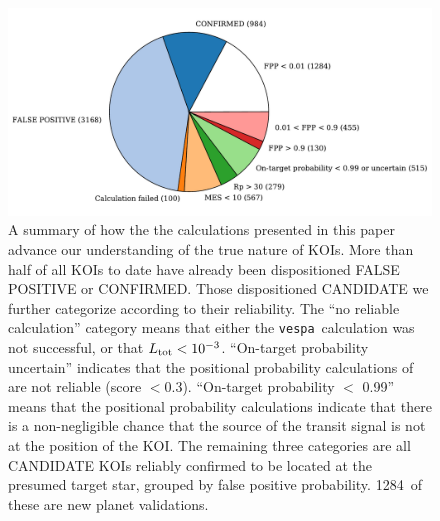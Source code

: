 \documentclass{emulateapj}
\newcommand{\figlabel}[1]{\label{fig:#1}}
\newcommand{\nvalnew}{1284} %
\newcommand{\nfpnew}{428}  %
\newcommand{\posprobthresh}{0.3}
\newcommand{\vespa}{\texttt{vespa}}
\begin{document}
\begin{figure}[p]
\begin{center}
\includegraphics[width=7in]{figures/fpp_pie.pdf}
\end{center}
\caption{A summary of how the the calculations presented in this paper
  advance our understanding of the true nature of KOIs.  More than
  half of all KOIs to date have already been dispositioned FALSE
  POSITIVE or CONFIRMED.  Those dispositioned CANDIDATE we further
  categorize according to their reliability.  The ``no reliable
  calculation'' category means that either the \vespa\ calculation was
  not successful, or that $L_{\rm tot} < 10^{-3}$.  ``On-target
  probability uncertain'' indicates that the positional probability
  calculations of \citet{Bryson:KSCI} are not reliable (score $<
  \posprobthresh$).  ``On-target probability $<$ 0.99'' means that the positional
  probability calculations indicate that there is a non-negligible
  chance that the source of the transit signal is not at the position
  of the KOI.  The remaining three categories are all CANDIDATE KOIs
  reliably confirmed to be located at the presumed target star,
  grouped by false positive probability.  \nvalnew\ of these are new
  planet validations.%
  \figlabel{fpppie}}
\end{figure}
\end{document}
